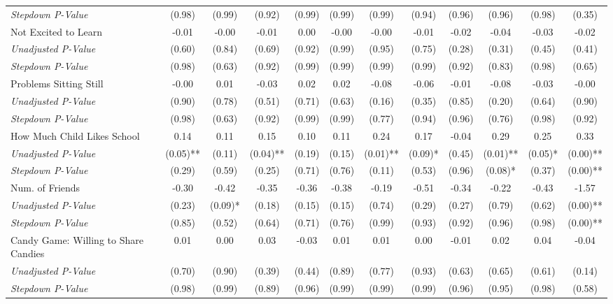 \begin{tabular}{l c c c c c c c c c c c}
\quad \textit{Stepdown P-Value} & (0.98) & (0.99) & (0.92) & (0.99) & (0.99) & (0.99) & (0.94) & (0.96) & (0.96) & (0.98) & (0.35) \\
Not Excited to Learn & -0.01 & -0.00 & -0.01 & 0.00 & -0.00 & -0.00 & -0.01 & -0.02 & -0.04 & -0.03 & -0.02 \\
\quad \textit{Unadjusted P-Value} & (0.60) & (0.84) & (0.69) & (0.92) & (0.99) & (0.95) & (0.75) & (0.28) & (0.31) & (0.45) & (0.41) \\
\quad \textit{Stepdown P-Value} & (0.98) & (0.63) & (0.92) & (0.99) & (0.99) & (0.99) & (0.99) & (0.92) & (0.83) & (0.98) & (0.65) \\
Problems Sitting Still & -0.00 & 0.01 & -0.03 & 0.02 & 0.02 & -0.08 & -0.06 & -0.01 & -0.08 & -0.03 & -0.00 \\
\quad \textit{Unadjusted P-Value} & (0.90) & (0.78) & (0.51) & (0.71) & (0.63) & (0.16) & (0.35) & (0.85) & (0.20) & (0.64) & (0.90) \\
\quad \textit{Stepdown P-Value} & (0.98) & (0.63) & (0.92) & (0.99) & (0.99) & (0.77) & (0.94) & (0.96) & (0.76) & (0.98) & (0.92) \\
How Much Child Likes School & 0.14 & 0.11 & 0.15 & 0.10 & 0.11 & 0.24 & 0.17 & -0.04 & 0.29 & 0.25 & 0.33 \\
\quad \textit{Unadjusted P-Value} & (0.05)** & (0.11) & (0.04)** & (0.19) & (0.15) & (0.01)** & (0.09)* & (0.45) & (0.01)** & (0.05)* & (0.00)** \\
\quad \textit{Stepdown P-Value} & (0.29) & (0.59) & (0.25) & (0.71) & (0.76) & (0.11) & (0.53) & (0.96) & (0.08)* & (0.37) & (0.00)** \\
Num. of Friends & -0.30 & -0.42 & -0.35 & -0.36 & -0.38 & -0.19 & -0.51 & -0.34 & -0.22 & -0.43 & -1.57 \\
\quad \textit{Unadjusted P-Value} & (0.23) & (0.09)* & (0.18) & (0.15) & (0.15) & (0.74) & (0.29) & (0.27) & (0.79) & (0.62) & (0.00)** \\
\quad \textit{Stepdown P-Value} & (0.85) & (0.52) & (0.64) & (0.71) & (0.76) & (0.99) & (0.93) & (0.92) & (0.96) & (0.98) & (0.00)** \\
Candy Game: Willing to Share Candies & 0.01 & 0.00 & 0.03 & -0.03 & 0.01 & 0.01 & 0.00 & -0.01 & 0.02 & 0.04 & -0.04 \\
\quad \textit{Unadjusted P-Value} & (0.70) & (0.90) & (0.39) & (0.44) & (0.89) & (0.77) & (0.93) & (0.63) & (0.65) & (0.61) & (0.14) \\
\quad \textit{Stepdown P-Value} & (0.98) & (0.99) & (0.89) & (0.96) & (0.99) & (0.99) & (0.99) & (0.96) & (0.95) & (0.98) & (0.58) \\
\bottomrule
\end{tabular}

